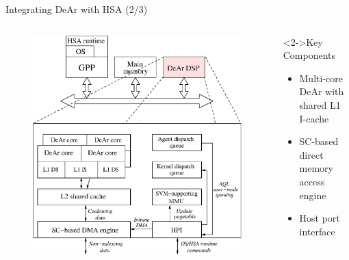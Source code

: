 \documentclass{beamer}
\begin{document}
\begin{CJK}{UTF8}{bkai}
            \begin{frame}{Integrating DeAr with HSA (2/3)}
                \begin{columns}
                    \begin{column}{0.6\textwidth}
                        \vspace{-1em}
                        \begin{figure}[!ht] 
                            \centering
                            \includegraphics[width=1.0\textwidth]{./figs/archi.eps}
                            \label{fig:archi}
                        \end{figure}
                    \end{column}
                    \begin{column}{0.40\textwidth}
                        \begin{block}<2->{Key Components}
                            \begin{itemize}
                                \item <3->{Multi-core DeAr with shared L1 I-cache}
                                \item <4->{SC-based direct memory access engine}
                                \item <5->{Host port interface}
                            \end{itemize}
                        \end{block}
                    \end{column}
                \end{columns}
            \end{frame}


\end{CJK}
\end{document}
